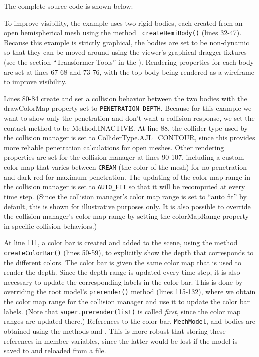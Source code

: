 The complete source code is shown below:
%
\lstset{numbers=left}

\lstset{numbers=none} 

To improve visibility, the example uses two rigid bodies, each created
from an open hemispherical mesh using the method {\tt
createHemiBody()} (lines 32-47). Because this example is strictly
graphical, the bodies are set to be non-dynamic so that they can be
moved around using the viewer's graphical dragger fixtures (see the
section ``Transformer Tools'' in the
). 
Rendering properties for each body are set at lines
67-68 and 73-76, with the top body being rendered as a wireframe to
improve visibility.

Lines 80-84 create and set a collision behavior between the two bodies
with the {\sf drawColorMap} property set to
{\tt PENETRATION\_DEPTH}. Because for this example we
want to show only the penetration and don't want a collision response,
we set the contact method to be %
{Method.INACTIVE}.
At line 88, the collider type used by the collision manager is set to
%
{ColliderType.AJL\_CONTOUR}, since this provides more reliable
penetration calculations for open meshes.  Other rendering properties
are set for the collision manager at lines 90-107, including a custom
color map that varies between {\tt CREAM} (the color of the mesh) for
no penetration and dark red for maximum penetration. The updating of
the color map range in the collision manager is set to {\tt AUTO\_FIT}
so that it will be recomputed at every time step. (Since the collision
manager's color map range is set to ``auto fit'' by default, this is
shown for illustrative purposes only. It is also possible to override
the collision manager's color map range by setting the {\sf
colorMapRange} property in specific collision behaviors.)

At line 111, a color bar is created and added to the scene, using the
method {\tt createColorBar()} (lines 50-59), to explicitly show the
depth that corresponds to the different colors. The color bar is given
the same color map that is used to render the depth. Since the depth
range is updated every time step, it is also necessary to update the
corresponding labels in the color bar. This is done by overriding the
root model's {\tt prerender()} method (lines 115-132), where we obtain
the color map range for the collision manager and use it to update the
color bar labels. (Note that {\tt super.prerender(list)} is called {\it
first}, since the color map ranges are updated there.)
References to the color bar, {\tt MechModel}, and
bodies are obtained using the
 methods
 and
.
This is more robust that storing these references in  member
variables, since the latter would be lost if the model is saved to and
reloaded from a file.


